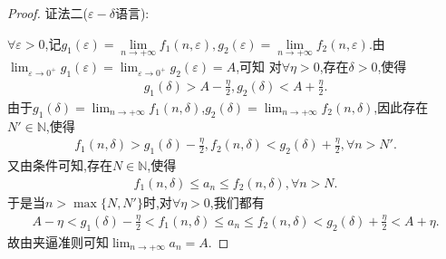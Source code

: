 \documentclass[lang=cn,newtx,10pt,scheme=chinese]{elegantbook}
\begin{document}
\begin{proof}
{\color{blue}证法二($\varepsilon-\delta$语言):}

$\forall \varepsilon>0$,记$g_1\left( \varepsilon \right) =\underset{n\rightarrow +\infty}{\lim}f_1(n,\varepsilon ),g_2\left( \varepsilon \right) =\underset{n\rightarrow +\infty}{\lim}f_2(n,\varepsilon ).$由\(\lim_{\varepsilon \to 0^+}g_1(\varepsilon)=\lim_{\varepsilon \to 0^+}g_2(\varepsilon)=A\),可知
对\(\forall \eta > 0\),存在\(\delta > 0\),使得
\begin{align*}
   g_1(\delta) > A - \frac{\eta}{2},g_2(\delta) < A + \frac{\eta}{2}.
\end{align*}
由于\(g_1(\delta)=\lim_{n \to +\infty}f_1(n,\delta)\),\(g_2(\delta)=\lim_{n \to +\infty}f_2(n,\delta)\),因此存在\(N'\in \mathbb{N}\),使得
\begin{align*}
   f_1(n,\delta) > g_1(\delta) - \frac{\eta}{2},f_2(n,\delta) < g_2(\delta) + \frac{\eta}{2},\forall n > N'.
\end{align*}
又由条件可知,存在\(N\in \mathbb{N}\),使得
\begin{align*}
  f_1(n,\delta) \leqslant a_n \leqslant f_2(n,\delta),\forall n > N .
\end{align*}
于是当\(n > \max\{N,N'\}\)时,对\(\forall \eta > 0\),我们都有
\begin{align*}
   A - \eta < g_1(\delta) - \frac{\eta}{2} < f_1(n,\delta) \leqslant a_n \leqslant f_2(n,\delta) < g_2(\delta) + \frac{\eta}{2} < A + \eta.
\end{align*}
故由夹逼准则可知\(\lim_{n \to +\infty}a_n = A\). 
\end{proof}
\end{document}
